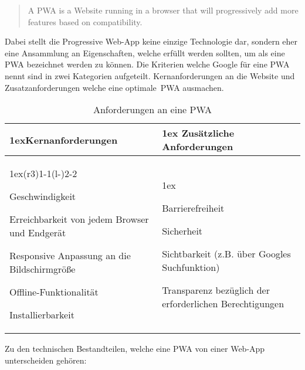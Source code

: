 \blockcquote{firtman_mobile_web}{
	A PWA is a Website running in a browser that will progressively add more features based on compatibility.
}


Dabei stellt die Progressive Web-App keine einzige Technologie dar, sondern eher eine Ansammlung an Eigenschaften, welche erfüllt werden sollten, um als eine \ac{PWA} bezeichnet werden zu können. Die Kriterien welche Google für eine \ac{PWA} nennt sind in zwei Kategorien aufgeteilt. Kernanforderungen an die Website und Zusatzanforderungen welche eine \glqq optimale\grqq\ \ac{PWA} ausmachen.\\


\begin{table}[!h]
	\begin{tabularx}{\linewidth}{>{\parskip1ex}X@{\kern4\tabcolsep}>{\parskip1ex}X}
		\toprule
		\hfil\bfseries Kernanforderungen
		&
		\hfil\bfseries Zusätzliche Anforderungen
		\\\cmidrule(r{3\tabcolsep}){1-1}\cmidrule(l{-\tabcolsep}){2-2}
		
		Geschwindigkeit\par
		Erreichbarkeit von jedem Browser und Endgerät\par
		Responsive Anpassung an die Bildschirmgröße\par
		Offline-Funktionalität\par
		Installierbarkeit\par
		
		&
		
		Barrierefreiheit\par
		Sicherheit\par
		Sichtbarkeit (z.B. über Googles Suchfunktion)\par
		Transparenz bezüglich der erforderlichen Berechtigungen\par
		\\\bottomrule
	\end{tabularx}
	\caption[Anforderungen an eine \ac{PWA}]{Anforderungen an eine \ac{PWA}\cite{google_pwa_check}}
\end{table}

\newpage
Zu den technischen Bestandteilen, welche eine \ac{PWA} von einer Web-App unterscheiden gehören:\\

